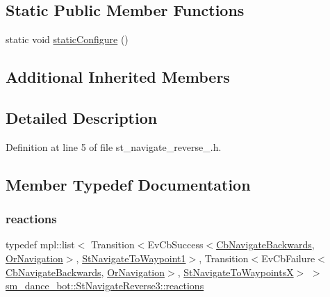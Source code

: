 \subsection*{Static Public Member Functions}
\begin{DoxyCompactItemize}
\item 
static void \hyperlink{structsm__dance__bot_1_1StNavigateReverse3_a01fcc1e52c2bc616febfc19c01c72612}{static\+Configure} ()
\end{DoxyCompactItemize}
\subsection*{Additional Inherited Members}


\subsection{Detailed Description}


Definition at line 5 of file st\+\_\+navigate\+\_\+reverse\+\_.\+h.



\subsection{Member Typedef Documentation}
\mbox{\label{structsm__dance__bot_1_1StNavigateReverse3_a8cb2887a228ce50b43ccc963cc6f73d6}} 
\subsubsection{\texorpdfstring{reactions}{reactions}}
{\footnotesize\ttfamily typedef mpl\+::list$<$ Transition$<$Ev\+Cb\+Success$<$\hyperlink{classcl__move__base__z_1_1CbNavigateBackwards}{Cb\+Navigate\+Backwards}, \hyperlink{classsm__dance__bot_1_1OrNavigation}{Or\+Navigation}$>$, \hyperlink{structsm__dance__bot_1_1StNavigateToWaypoint1}{St\+Navigate\+To\+Waypoint1}$>$, Transition$<$Ev\+Cb\+Failure$<$\hyperlink{classcl__move__base__z_1_1CbNavigateBackwards}{Cb\+Navigate\+Backwards}, \hyperlink{classsm__dance__bot_1_1OrNavigation}{Or\+Navigation}$>$, \hyperlink{structsm__dance__bot_1_1StNavigateToWaypointsX}{St\+Navigate\+To\+WaypointsX}$>$ $>$ \hyperlink{structsm__dance__bot_1_1StNavigateReverse3_a8cb2887a228ce50b43ccc963cc6f73d6}{sm\+\_\+dance\+\_\+bot\+::\+St\+Navigate\+Reverse3\+::reactions}}



